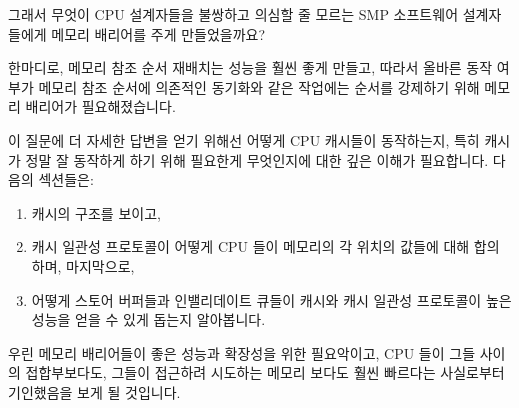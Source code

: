 

그래서 무엇이 CPU 설계자들을 불쌍하고 의심할 줄 모르는 SMP 소프트웨어
설계자들에게 메모리 배리어를 주게 만들었을까요?

한마디로, 메모리 참조 순서 재배치는 성능을 훨씬 좋게 만들고, 따라서 올바른 동작
여부가 메모리 참조 순서에 의존적인 동기화와 같은 작업에는 순서를 강제하기 위해
메모리 배리어가 필요해졌습니다.

이 질문에 더 자세한 답변을 얻기 위해선 어떻게 CPU 캐시들이 동작하는지, 특히
캐시가 정말 잘 동작하게 하기 위해 필요한게 무엇인지에 대한 깊은 이해가
필요합니다.
다음의 섹션들은:
\begin{enumerate}
\item	캐시의 구조를 보이고,
\item	캐시 일관성 프로토콜이 어떻게 CPU 들이 메모리의 각 위치의 값들에 대해
	합의하며, 마지막으로,
\item	어떻게 스토어 버퍼들과 인밸리데이트 큐들이 캐시와 캐시 일관성
	프로토콜이 높은 성능을 얻을 수 있게 돕는지 알아봅니다.
\end{enumerate}
우린 메모리 배리어들이 좋은 성능과 확장성을 위한 필요악이고, CPU 들이 그들
사이의 접합부보다도, 그들이 접근하려 시도하는 메모리 보다도 훨씬 빠르다는
사실로부터 기인했음을 보게 될 것입니다.


